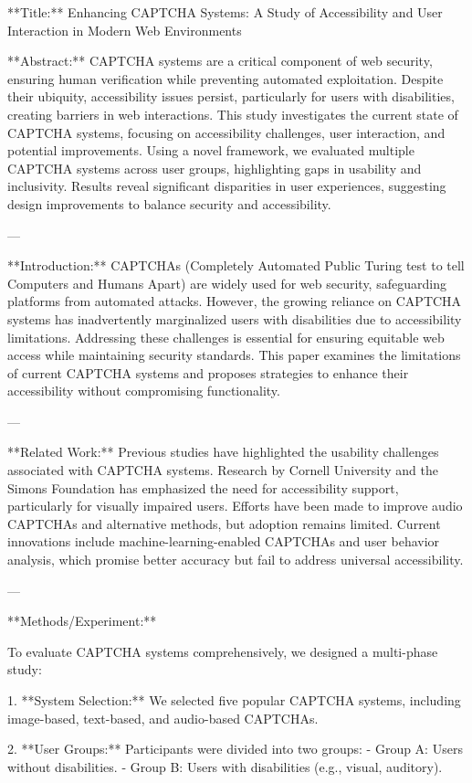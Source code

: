 **Title:** Enhancing CAPTCHA Systems: A Study of Accessibility and User Interaction in Modern Web Environments  

**Abstract:**  
CAPTCHA systems are a critical component of web security, ensuring human verification while preventing automated exploitation. Despite their ubiquity, accessibility issues persist, particularly for users with disabilities, creating barriers in web interactions. This study investigates the current state of CAPTCHA systems, focusing on accessibility challenges, user interaction, and potential improvements. Using a novel framework, we evaluated multiple CAPTCHA systems across user groups, highlighting gaps in usability and inclusivity. Results reveal significant disparities in user experiences, suggesting design improvements to balance security and accessibility.  

---

**Introduction:**  
CAPTCHAs (Completely Automated Public Turing test to tell Computers and Humans Apart) are widely used for web security, safeguarding platforms from automated attacks. However, the growing reliance on CAPTCHA systems has inadvertently marginalized users with disabilities due to accessibility limitations. Addressing these challenges is essential for ensuring equitable web access while maintaining security standards. This paper examines the limitations of current CAPTCHA systems and proposes strategies to enhance their accessibility without compromising functionality.  

---

**Related Work:**  
Previous studies have highlighted the usability challenges associated with CAPTCHA systems. Research by Cornell University and the Simons Foundation has emphasized the need for accessibility support, particularly for visually impaired users. Efforts have been made to improve audio CAPTCHAs and alternative methods, but adoption remains limited. Current innovations include machine-learning-enabled CAPTCHAs and user behavior analysis, which promise better accuracy but fail to address universal accessibility.  

---

**Methods/Experiment:**  

To evaluate CAPTCHA systems comprehensively, we designed a multi-phase study:  

1. **System Selection:**  
   We selected five popular CAPTCHA systems, including image-based, text-based, and audio-based CAPTCHAs.  

2. **User Groups:**  
   Participants were divided into two groups:  
   - Group A: Users without disabilities.  
   - Group B: Users with disabilities (e.g., visual, auditory).  

